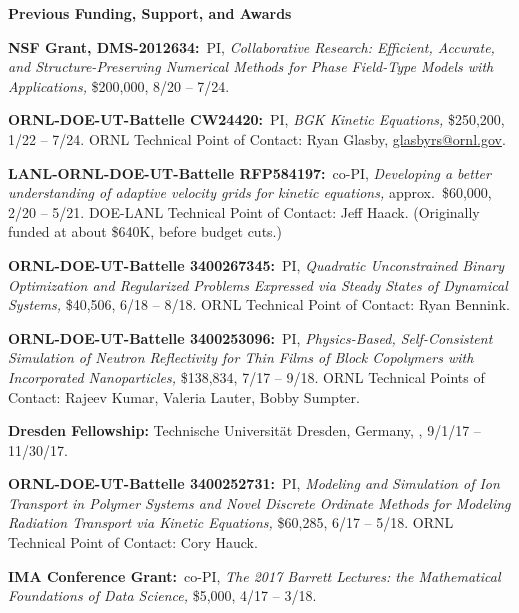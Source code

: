 \documentclass[11pt]{letter}
\begin{document}
{\LARGE\bf Previous Funding, Support, and Awards}
    \begin{description} 
    
    \item
\textbf{NSF Grant, DMS-2012634:}~PI, {\sl Collaborative Research:  Efficient, Accurate, and Structure-Preserving Numerical Methods for Phase Field-Type Models with Applications,} \$200,000, 8/20 -- 7/24.
    
    \item
\textbf{ORNL-DOE-UT-Battelle CW24420:}~PI, {\sl BGK Kinetic Equations,} \$250,200, 1/22 -- 7/24. ORNL Technical Point of Contact: Ryan Glasby, \url{glasbyrs@ornl.gov}.
    
    \item
\textbf{LANL-ORNL-DOE-UT-Battelle RFP584197:}~co-PI, {\sl Developing a better understanding of adaptive velocity grids for kinetic equations,} approx.~\$60,000, 2/20 -- 5/21. DOE-LANL Technical Point of Contact: Jeff Haack. (Originally funded at about \$640K, before budget cuts.)
 
    \item
\textbf{ORNL-DOE-UT-Battelle 3400267345:}~PI, {\sl Quadratic Unconstrained Binary Optimization and Regularized Problems Expressed via Steady States of Dynamical Systems,} \$40,506, 6/18 -- 8/18. ORNL Technical Point of Contact: Ryan Bennink.
    
    \item
\textbf{ORNL-DOE-UT-Battelle 3400253096:}~PI, {\sl Physics-Based, Self-Consistent Simulation of Neutron Reflectivity for Thin Films of Block Copolymers with Incorporated Nanoparticles,} \$138,834, 7/17 -- 9/18. ORNL Technical Points of Contact: Rajeev Kumar, Valeria Lauter, Bobby Sumpter.

    \item
\textbf{Dresden Fellowship:} Technische Universit\"{a}t Dresden, Germany,  , 9/1/17 -- 11/30/17.
    
    \item
\textbf{ORNL-DOE-UT-Battelle 3400252731:}~PI, {\sl Modeling and Simulation of Ion Transport in Polymer Systems and Novel Discrete Ordinate Methods for Modeling Radiation Transport via Kinetic Equations,} \$60,285, 6/17 -- 5/18. ORNL Technical Point of Contact: Cory Hauck.

    \item
\textbf{IMA Conference Grant:}~co-PI, {\sl The 2017 Barrett Lectures: the Mathematical Foundations of Data Science,} \$5,000, 4/17 -- 3/18.



\end{description}
\end{document}
